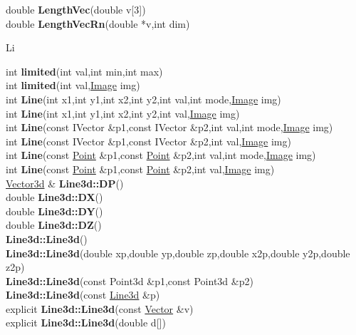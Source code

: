 \documentclass[10pt,titlepage]{article}
\def\functionlistentry#1#2#3#4#5#6{\noindent #1 {\bf #2}(#3) \dotfill #6\\}
\def\letterref#1{}
\def\letterlabel#1{\vspace{0.5cm}\centerline{\Large #1}}
\def\letterlabelend#1{}
\begin{document}
{{\letterref{La}
\letterref{Le}
\letterref{Li}
\letterref{Lm}
\letterref{Lo}
\letterref{Ls}
\letterref{Lu}
\letterlabelend{Le}
\functionlistentry{double}{LengthVec}{double v[3]}{1557}{obsolet}{}
\functionlistentry{double}{LengthVecRn}{double *v,int dim}{1567}{obsolet}{}

\letterlabel{Li}
\letterref{A}
\letterref{B}
\letterref{C}
\letterref{D}
\letterref{E}
\letterref{F}
\letterref{G}
\letterref{H}
\letterref{I}
\letterref{K}
\letterref{L}
\letterref{M}
\letterref{N}
\letterref{O}
\letterref{P}
\letterref{Q}
\letterref{R}
\letterref{S}
\letterref{T}
\letterref{U}
\letterref{V}
\letterref{W}
\letterref{X}
\letterref{Y}
\letterref{Z}

\letterref{La}
\letterref{Le}
\letterref{Li}
\letterref{Lm}
\letterref{Lo}
\letterref{Ls}
\letterref{Lu}
\letterlabelend{Li}
\functionlistentry{int}{limited}{int val,int min,int max}{1343}{numeric}{}
\functionlistentry{int}{limited}{int val,\hyperlink{Image}{Image} img}{1344}{numeric}{}
\functionlistentry{int}{Line}{int x1,int y1,int x2,int y2,int val,int mode,\hyperlink{Image}{Image} img}{1317}{graphics}{}
\functionlistentry{int}{Line}{int x1,int y1,int x2,int y2,int val,\hyperlink{Image}{Image} img}{1318}{graphics}{}
\functionlistentry{int}{Line}{const IVector \&p1,const IVector \&p2,int val,int mode,\hyperlink{Image}{Image} img}{1319}{graphics}{}
\functionlistentry{int}{Line}{const IVector \&p1,const IVector \&p2,int val,\hyperlink{Image}{Image} img}{1320}{graphics}{}
\functionlistentry{int}{Line}{const \hyperlink{Point}{Point} \&p1,const \hyperlink{Point}{Point} \&p2,int val,int mode,\hyperlink{Image}{Image} img}{1321}{graphics}{}
\functionlistentry{int}{Line}{const \hyperlink{Point}{Point} \&p1,const \hyperlink{Point}{Point} \&p2,int val,\hyperlink{Image}{Image} img}{1322}{graphics}{}
\functionlistentry{\hyperlink{Vector3d}{Vector3d} \&}{Line3d::DP}{}{676}{geoObject3d}{}
\functionlistentry{double}{Line3d::DX}{}{673}{geoObject3d}{}
\functionlistentry{double}{Line3d::DY}{}{674}{geoObject3d}{}
\functionlistentry{double}{Line3d::DZ}{}{675}{geoObject3d}{}
\functionlistentry{}{Line3d::Line3d}{}{659}{geoObject3d}{}
\functionlistentry{}{Line3d::Line3d}{double xp,double yp,double zp,double x2p,double y2p,double z2p}{660}{geoObject3d}{}
\functionlistentry{}{Line3d::Line3d}{const Point3d \&p1,const Point3d \&p2}{661}{geoObject3d}{}
\functionlistentry{}{Line3d::Line3d}{const \hyperlink{Line3d}{Line3d} \&p}{662}{geoObject3d}{}
\functionlistentry{explicit}{Line3d::Line3d}{const \hyperlink{Vector}{Vector} \&v}{663}{geoObject3d}{}
\functionlistentry{explicit}{Line3d::Line3d}{double d[]}{664}{geoObject3d}{}
}}
\end{document}
